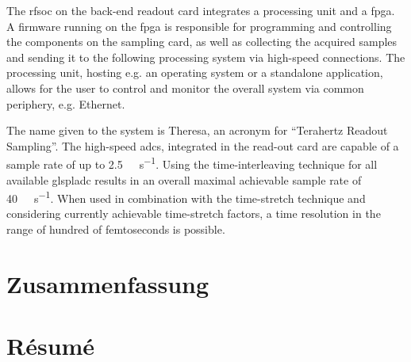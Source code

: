 The \gls{rfsoc} on the back-end readout card integrates a processing unit and a \gls{fpga}. 
A firmware running on the \gls{fpga} is responsible for programming and controlling the components on the sampling card, as well as collecting the acquired samples and sending it to the following processing system via high-speed connections.
The processing unit, hosting e.g. an operating system or a standalone application, allows for the user to control and monitor the overall system via common periphery, e.g. Ethernet.

The name given to the system is Theresa, an acronym for ``Terahertz Readout Sampling''.
The high-speed \glspl{adc}, integrated in the read-out card are capable of a sample rate of up to \SI{2.5}{\giga \sample \per \second}.
Using the time-interleaving technique for all available glspl{adc} results in an overall maximal achievable sample rate of \SI{40}{\giga \sample \per \second}.  %
When used in combination with the time-stretch technique and considering currently achievable time-stretch factors, a time resolution in the range of hundred of femtoseconds is possible. %

\chapter*{Zusammenfassung}
\chapter*{Résumé}